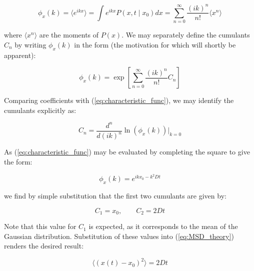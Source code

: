 \documentclass[11pt, a4paper]{article} %
\begin{document}
\begin{appendices}
\begin{equation} \label{eq:characteristic_func}
\phi_{x}(k) = \langle e^{ikx} \rangle = \int e^{ikx} P(x,t \mid x_{0}) dx = \sum_{n=0}^{\infty} \frac{(ik)^{n}}{n!}\langle x^{n} \rangle
\end{equation}

where $\langle x^{n} \rangle$ are the moments of $P(x)$. We may separately define the cumulants $C_{n}$ by writing $\phi_{x}(k)$ in the form (the motivation for which will shortly be apparent):

\begin{equation}
\phi_{x}(k) =  \exp \left[\sum_{n=0}^{\infty} \frac{(ik)^{n}}{n!} C_{n}  \right]
\end{equation}

Comparing coefficients with (\ref{eq:characteristic_func}), we may identify the cumulants explicitly as:

\begin{equation}
C_{n} = \frac{d^{n}}{d(ik)^{n}} \ln \left(\phi_{x}(k) \right) \biggr|_{k=0} 
\end{equation}

As (\ref{eq:characteristic_func}) may be evaluated by completing the square to give the form:

\begin{equation}
\phi_{x}(k) = e^{ikx_{0} - k^{2}Dt}
\end{equation}

we find by simple substitution that the first two cumulants are given by:

\begin{equation}
C_{1} = x_{0}, \qquad C_{2} = 2Dt
\end{equation}

Note that this value for $C_{1}$ is expected, as it corresponds to the mean of the Gaussian distribution. Substitution of these values into (\ref{eq:MSD_theory}) renders the desired result:

\begin{equation}
\langle (x(t) - x_{0})^{2} \rangle = 2Dt
\end{equation}

\end{appendices}

\end{document}

